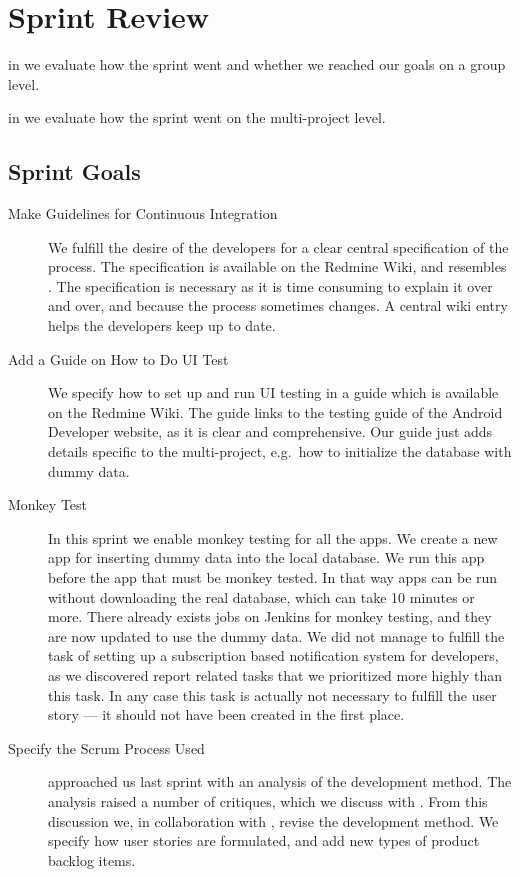 \chapter{Sprint Review}\label{chap:sprint3_end}

\begin{chapterorganization}
  \item in  we evaluate how the sprint went and whether we reached our goals on a group level.
  \item in  we evaluate how the sprint went on the multi-project level.
\end{chapterorganization}

\section{Sprint Goals}\label{sec:s3_goals}
\begin{description}
  \item[Make Guidelines for Continuous Integration] We fulfill the desire of the developers for a clear central specification of the process. The specification is available on the Redmine Wiki, and resembles . The specification is necessary as it is time consuming to explain it over and over, and because the process sometimes changes. A central wiki entry helps the developers keep up to date.
  \item[Add a Guide on How to Do UI Test] We specify how to set up and run UI testing in a guide which is available on the Redmine Wiki. The guide links to the testing guide \parencite{AndroidUnit} of the Android Developer website, as it is clear and comprehensive. Our guide just adds details specific to the multi-project, e.g.\ how to initialize the database with dummy data.
  \item[Monkey Test] In this sprint we enable monkey testing for all the apps. We create a new app for inserting dummy data into the local database. We run this app before the app that must be monkey tested. In that way apps can be run without downloading the real database, which can take 10 minutes or more. There already exists jobs on Jenkins for monkey testing, and they are now updated to use the dummy data. We did not manage to fulfill the task of setting up a subscription based notification system for developers, as we discovered report related tasks that we prioritized more highly than this task. In any case this task is actually not necessary to fulfill the user story --- it should not have been created in the first place.
  \item[Specify the Scrum Process Used]  approached us last sprint with an analysis of the development method. The analysis raised a number of critiques, which we discuss with . From this discussion we, in collaboration with , revise the development method. We specify how user stories are formulated, and add new types of product backlog items.
\end{description}

